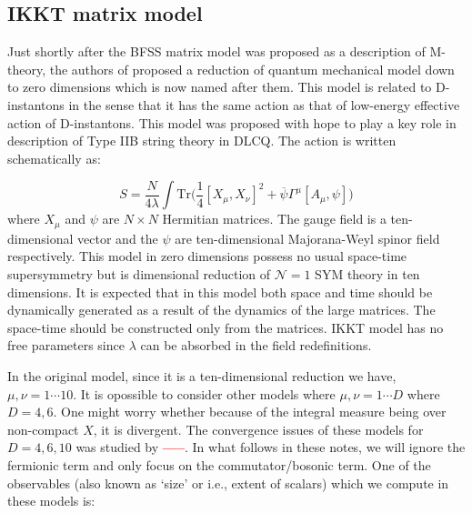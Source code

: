 \documentclass[11pt]{article}
\newcommand{\TODO}[1]{\textcolor{red}{{\bf #1}}}
\begin{document}
 


\subsection{IKKT matrix model}

Just shortly after the BFSS matrix model was proposed as a description of M-theory, the authors of 
\cite{Ishibashi:1996xs} proposed a reduction of quantum mechanical model down to zero dimensions which is now named after them. This model is related to D-instantons in the sense that it has the same action as that of low-energy effective action of D-instantons. This model was proposed with hope to play a key role in description of Type IIB string theory in DLCQ. The action is written schematically as:

\begin{equation}
	\label{eq:IKKT} 
S = \frac{N}{4\lambda} \int \mbox{Tr} \Big( \frac{1}{4} [X_\mu, X_\nu]^{2} + \overline{\psi} \Gamma^{\mu} [A_{\mu},\psi] \Big) 
\end{equation}
where $X_{\mu}$ and $\psi$ are $N \times N$ Hermitian matrices. The gauge field is a ten-dimensional vector and the $\psi$ are ten-dimensional Majorana-Weyl spinor field respectively. This model in zero dimensions possess no usual space-time supersymmetry 
but is dimensional reduction of $\mathcal{N}=1$ SYM theory in ten dimensions. 
It is expected that in this model both space and time should be dynamically generated as a result of the dynamics of the large matrices. The space-time should be constructed only from the matrices. IKKT model has no free parameters since $\lambda$ can be absorbed in the field redefinitions. 

In the original model, since it is a ten-dimensional reduction we have, $\mu, \nu = 1 \cdots 10$. It is opossible to consider other models where $\mu, \nu = 1 \cdots D$ where $D=4,6$. One might worry whether because of the integral measure being over non-compact $X$, it is divergent. The convergence issues of these models for $D=4,6,10$ was studied by \TODO{-----}. In what follows in these notes, we will ignore the fermionic term and only focus on the commutator/bosonic term. One of the observables (also known as `size' or i.e., extent of scalars) which we compute in these models is:
\end{document}
